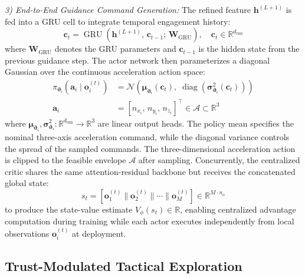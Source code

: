\documentclass[lettersize,journal]{IEEEtran}
\begin{document}
\emph{3) End-to-End Guidance Command Generation:} The refined feature $\mathbf{h}^{(L+1)}$ is fed into a GRU cell to integrate temporal engagement history:
\begin{equation}
\label{eq:gru}
\mathbf{c}_t = \operatorname{GRU}\!\left(\mathbf{h}^{(L+1)},\, \mathbf{c}_{t-1};\, \mathbf{W}_{\mathrm{GRU}}\right), \quad \mathbf{c}_t \in \mathbb{R}^{d_{\mathrm{rnn}}}
\end{equation}
where $\mathbf{W}_{\mathrm{GRU}}$ denotes the GRU parameters and $\mathbf{c}_{t-1}$ is the hidden state from the previous guidance step. The actor network then parameterizes a diagonal Gaussian over the continuous acceleration action space:
\begin{equation}
\label{eq:actor_dist}
\begin{split}
\pi_{\boldsymbol{\vartheta}_i}\!\left(\mathbf{a}_i \mid \mathbf{o}_i^{(t)}\right) &= \mathcal{N}\!\left(\boldsymbol{\mu}_{\boldsymbol{\vartheta}_i}(\mathbf{c}_t),\; \operatorname{diag}\!\left(\boldsymbol{\sigma}_{\boldsymbol{\vartheta}_i}^2(\mathbf{c}_t)\right)\right) \\
\mathbf{a}_i &= [n_{x_i},\,n_{y_i},\,n_{z_i}]^\top \in \mathcal{A}\subset\mathbb{R}^3
\end{split}
\end{equation}
where $\boldsymbol{\mu}_{\boldsymbol{\vartheta}_i}, \boldsymbol{\sigma}_{\boldsymbol{\vartheta}_i}^2: \mathbb{R}^{d_{\mathrm{rnn}}} \to \mathbb{R}^3$ are linear output heads. 
The policy mean specifies the nominal three-axis acceleration
command, while the diagonal variance controls the spread of the sampled
commands.
The three-dimensional acceleration action is clipped to the feasible envelope $\mathcal{A}$ after sampling. Concurrently, the centralized critic shares the same attention-residual backbone but receives the concatenated global state:
\begin{equation}
\label{eq:critic_input}
s_t = \left[\mathbf{o}_1^{(t)} \| \mathbf{o}_2^{(t)} \| \cdots \| \mathbf{o}_M^{(t)}\right] \in \mathbb{R}^{M \cdot n_o}
\end{equation}
to produce the state-value estimate $V_\phi(s_t) \in \mathbb{R}$, enabling centralized advantage computation during training while each actor executes independently from local observations $\mathbf{o}_i^{(t)}$ at deployment.

\subsection{Trust-Modulated Tactical Exploration}
\label{subsec:trust_exploration}
\end{document}
